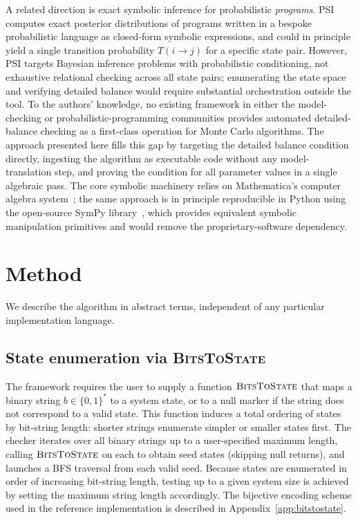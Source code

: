 \documentclass[twocolumn,10pt]{article}
\begin{document}
A related direction is exact symbolic inference for probabilistic
\emph{programs}.  PSI~\cite{Gehr2016} computes exact posterior
distributions of programs written in a bespoke probabilistic language as
closed-form symbolic expressions, and could in principle yield a single
transition probability $T(i\to j)$ for a specific state pair.  However,
PSI targets Bayesian inference problems with probabilistic conditioning,
not exhaustive relational checking across all state pairs; enumerating the
state space and verifying detailed balance would require substantial
orchestration outside the tool.  To the authors' knowledge, no existing
framework in either the model-checking or probabilistic-programming
communities provides automated detailed-balance checking as a first-class
operation for Monte Carlo algorithms.  The approach presented here fills
this gap by targeting the detailed balance condition directly, ingesting
the algorithm as executable code without any model-translation step, and
proving the condition for all parameter values in a single algebraic pass.
The core symbolic machinery relies on Mathematica's computer algebra
system~\cite{Mathematica}; the same approach is in principle reproducible
in Python using the open-source SymPy library~\cite{Meurer2017}, which
provides equivalent symbolic manipulation primitives and would remove the
proprietary-software dependency.

\section{Method}

We describe the algorithm in abstract terms, independent of any particular
implementation language.

\subsection{State enumeration via \textsc{BitsToState}}

The framework requires the user to supply a function $\textsc{BitsToState}$
that maps a binary string $b\in\{0,1\}^*$ to a system state, or to a null
marker if the string does not correspond to a valid state.  This function
induces a total ordering of states by bit-string length: shorter strings
enumerate simpler or smaller states first.  The checker iterates over all
binary strings up to a user-specified maximum length, calling
$\textsc{BitsToState}$ on each to obtain seed states (skipping null returns),
and launches a BFS traversal from each valid seed.  Because states are
enumerated in order of increasing bit-string length, testing up to a given
system size is achieved by setting the maximum string length accordingly.  The
bijective encoding scheme used in the reference implementation is described in
Appendix~\ref{app:bitstostate}.
\end{document}
